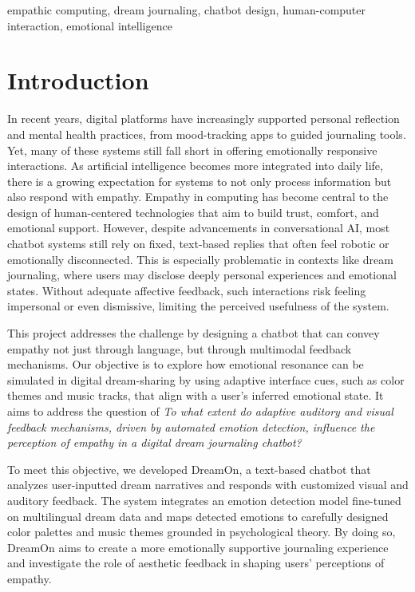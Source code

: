 \documentclass[conference]{IEEEtran}
\begin{document}
	\begin{IEEEkeywords}
		empathic computing, dream journaling, chatbot design, human-computer interaction, emotional intelligence
	\end{IEEEkeywords}
	
	\section{Introduction}
 	In recent years, digital platforms have increasingly supported personal reflection and mental health practices, from mood-tracking apps to guided journaling tools. Yet, many of these systems still fall short in offering emotionally responsive interactions. As artificial intelligence becomes more integrated into daily life, there is a growing expectation for systems to not only process information but also respond with empathy. Empathy in computing has become central to the design of human-centered technologies that aim to build trust, comfort, and emotional support. However, despite advancements in conversational AI, most chatbot systems still rely on fixed, text-based replies that often feel robotic or emotionally disconnected. This is especially problematic in contexts like dream journaling, where users may disclose deeply personal experiences and emotional states. Without adequate affective feedback, such interactions risk feeling impersonal or even dismissive, limiting the perceived usefulness of the system.

	This project addresses the challenge by designing a chatbot that can convey empathy not just through language, but through multimodal feedback mechanisms. Our objective is to explore how emotional resonance can be simulated in digital dream-sharing by using adaptive interface cues, such as color themes and music tracks, that align with a user's inferred emotional state. It aims to address the question of \textit{To what extent do adaptive auditory and visual feedback mechanisms, driven by automated emotion detection, influence the perception of empathy in a digital dream journaling chatbot?}
 
	To meet this objective, we developed DreamOn, a text-based chatbot that analyzes user-inputted dream narratives and responds with customized visual and auditory feedback. The system integrates an emotion detection model fine-tuned on multilingual dream data and maps detected emotions to carefully designed color palettes and music themes grounded in psychological theory. By doing so, DreamOn aims to create a more emotionally supportive journaling experience and investigate the role of aesthetic feedback in shaping users’ perceptions of empathy.
\end{document}
